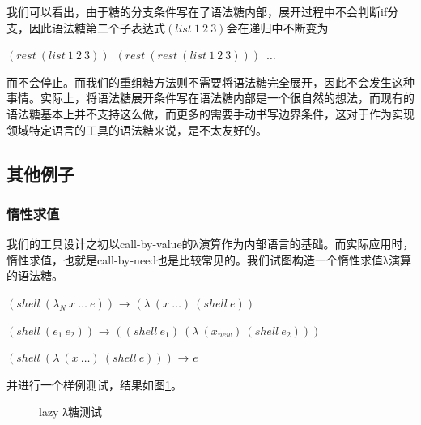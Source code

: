 我们可以看出，由于糖的分支条件写在了语法糖内部，展开过程中不会判断if分支，因此语法糖第二个子表达式$(list~1~2~3)$会在递归中不断变为
\begin{flushleft}
	$(rest~(list~1~2~3))$~$(rest~(rest~(list~1~2~3)))$~$\ldots$
\end{flushleft}
而不会停止。而我们的重组糖方法则不需要将语法糖完全展开，因此不会发生这种事情。实际上，将语法糖展开条件写在语法糖内部是一个很自然的想法，而现有的语法糖基本上并不支持这么做，而更多的需要手动书写边界条件，这对于作为实现领域特定语言的工具的语法糖来说，是不太友好的。

\subsection{其他例子}

\subsubsection{惰性求值}

我们的工具设计之初以call-by-value的λ演算作为内部语言的基础。而实际应用时，惰性求值，也就是call-by-need也是比较常见的。我们试图构造一个惰性求值λ演算的语法糖。

\begin{flushleft}
	$(shell~(\lambda_{N}~x~\ldots~e))$ → $(\lambda~(x~\ldots)~(shell~e))$
	
	$(shell~(e_{1}~e_{2}))$ → $((shell~e_{1})~(\lambda~(x_{new})~(shell~e_{2})))$
	
	$(shell~(\lambda~(x~\ldots)~(shell~e)))$ → $e$
\end{flushleft}

并进行一个样例测试，结果如图\ref{fig:lazy}。
\begin{figure}[h]
	\begin{center}
	\end{center}
	\caption{lazy λ糖测试}
	\label{fig:lazy}
\end{figure}


